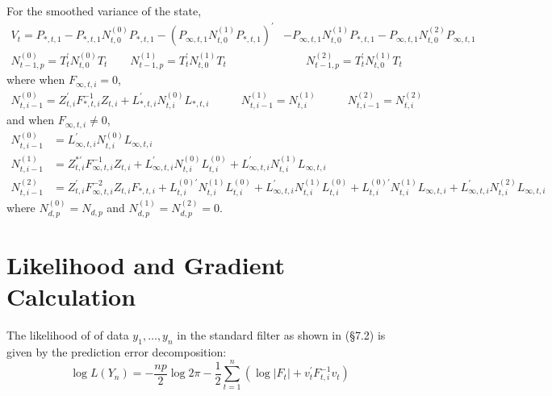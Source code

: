 \documentclass[12pt]{article}
\newcommand{\Cov}[0]{\text{Cov}}
\newcommand{\Var}[0]{\text{Var}}
\newcommand{\flag}[0]{red}
\begin{document}
	For the smoothed variance of the state, 
	\begin{align*}
	V_t = P_{*,t,1} - P_{*,t,1} N_{t,0}^{(0)} P_{*,t,1} - \left(P_{\infty,t,1} N_{t,0}^{(1)} P_{*,t,1} \right)^\prime &- P_{\infty,t,1} N_{t,0}^{(1)} P_{*,t,1} - P_{\infty,t,1} N_{t,0}^{(2)} P_{\infty,t,1} \\
	N_{t-1,p}^{(0)} = T_t^\prime N_{t,0}^{(0)} T_t \qquad
	N_{t-1,p}^{(1)} = T_t^\prime N_{t,0}^{(1)} T_t &\qquad
	N_{t-1,p}^{(2)} = T_t^\prime N_{t,0}^{(1)} T_t 
	\end{align*}
	where when $F_{\infty,t,i} = 0$, 
	\begin{align*}
	N_{t,i-1}^{(0)} = Z_{t,i}^\prime F_{*,t,i}^{-1} Z_{t,i} + L_{*,t,i}^\prime N_{t,i}^{(0)} L_{*,t,i} &\qquad
	N_{t,i-1}^{(1)} = N_{t,i}^{(1)} &\qquad
	N_{t,i-1}^{(2)} = N_{t,i}^{(2)} 
	\end{align*}
	and when $F_{\infty,t,i} \neq 0$,
	\begin{align*}
	N_{t,i-1}^{(0)} &= L_{\infty,t,i}^\prime N_{t,i}^{(0)} L_{\infty,t,i}\\
	N_{t,i-1}^{(1)} &= Z_{t,i}^{*\prime} F_{\infty,t,i}^{-1} Z_{t,i} + L_{\infty,t,i}^\prime N_{t,i}^{(0)} L_{t,i}^{(0)} + L_{\infty,t,i}^\prime N_{t,i}^{(1)} L_{\infty,t,i}  \\
	N_{t,i-1}^{(2)} &= Z_{t,i}^\prime F_{\infty,t,i}^{-2} Z_{t,i} F_{*,t,i} + L_{t,i}^{(0)\prime} N_{t,i}^{(1)} L_{t,i}^{(0)} + L_{\infty,t,i}^\prime N_{t,i}^{(1)} L_{t,i}^{(0)} + L_{t,i}^{(0)\prime} N_{t,i}^{(1)} L_{\infty,t,i} + L_{\infty,t,i}^\prime N_{t,i}^{(2)} L_{\infty,t,i}
	\end{align*}
	where $N_{d,p}^{(0)} = N_{d,p}$ and $N_{d,p}^{(1)} = N_{d,p}^{(2)} = 0$. 


\newpage
\section{Likelihood and Gradient Calculation}
	The likelihood of of data $y_1, \dots, y_n$ in the standard filter as shown in \cite{dk_book} (\S 7.2) is given by the prediction error decomposition:
	\begin{equation*}
	\log L(Y_n) = -\frac{np}{2} \log 2\pi - \frac{1}{2} \sum_{t=1}^n \left(\log |F_t| + v_t^\prime F_{t,i}^{-1} v_t \right)
	\end{equation*}
	
\end{document}
